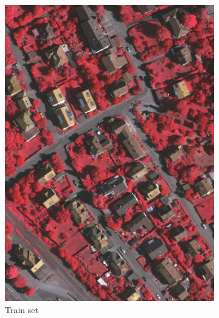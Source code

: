 \documentclass[10pt, a4paper]{article}
\begin{document}
\begin{figure}[htpb]
  \centering
  \begin{subfigure}[b]{0.32\textwidth}
      \centering
      \includegraphics[width=\textwidth]{images/Image_Train.pdf}
      \caption{Train set}
      \label{fig:example_train}
  \end{subfigure}
  \hspace{0.05\textwidth}
  \begin{subfigure}[b]{0.32\textwidth}
      \centering

\end{subfigure}
\end{figure}
\end{document}
